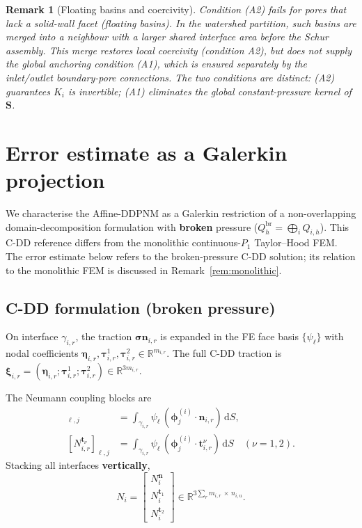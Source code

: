 \documentclass[11pt,a4paper]{article}
\newtheorem{remark}[lemma]{Remark}
\newcommand{\R}{\mathbb{R}}
\newcommand{\stress}{\bm{\sigma}}
\newcommand{\normal}{\bm{n}}
\newcommand{\Schur}{\mathbf{S}}
\begin{document}
\begin{remark}[Floating basins and coercivity]\label{rem:floating}
  Condition (A2) fails for pores that lack a solid-wall facet
  (\emph{floating basins}).  In the watershed partition, such basins
  are merged into a neighbour with a larger shared interface area
  before the Schur assembly.  This merge restores local coercivity
  (condition A2), but does \emph{not} supply the global anchoring
  condition (A1), which is ensured separately by the inlet/outlet
  boundary-pore connections.  The two conditions are distinct:
  (A2) guarantees $K_i$ is invertible; (A1) eliminates the global
  constant-pressure kernel of $\Schur$.
\end{remark}

\appendix
\section{Error estimate as a Galerkin projection}
\setcounter{lemma}{0}
\setcounter{theorem}{0}

We characterise the Affine-DDPNM as a Galerkin restriction of a
non-overlapping domain-decomposition formulation with \textbf{broken}
pressure ($Q_h^{\text{br}} = \bigoplus_i Q_{i,h}$).
This C-DD reference differs from the monolithic continuous-$P_1$
Taylor--Hood FEM.  The error estimate below refers to the broken-pressure
C-DD solution; its relation to the monolithic FEM is discussed in
Remark~\ref{rem:monolithic}.

\subsection{C-DD formulation (broken pressure)}

On interface $\gamma_{i,r}$, the traction $\stress\normal_{i,r}$ is
expanded in the FE face basis $\{\psi_\ell\}$ with nodal coefficients
$\bm{\eta}_{i,r},\bm{\tau}_{i,r}^1,\bm{\tau}_{i,r}^2 \in \R^{m_{i,r}}$.
The full C-DD traction is
$\bm{\xi}_{i,r} = (\bm{\eta}_{i,r}; \bm{\tau}_{i,r}^1; \bm{\tau}_{i,r}^2)
 \in \R^{3m_{i,r}}$.

The Neumann coupling blocks are
\begin{align*}
  [N_{i,r}^{\normal}]_{\ell,j} &=
    \int_{\gamma_{i,r}} \psi_\ell\,(\bm{\phi}_j^{(i)}
    \cdot \normal_{i,r})\,\mathrm{d}S,\\
  [N_{i,r}^{\bm{t}_\nu}]_{\ell,j} &=
    \int_{\gamma_{i,r}} \psi_\ell\,(\bm{\phi}_j^{(i)}
    \cdot \bm{t}_{i,r}^\nu)\,\mathrm{d}S \quad (\nu=1,2).
\end{align*}
Stacking all interfaces \textbf{vertically},
\[
  N_i =
  \begin{bmatrix}
    N_i^{\normal} \\ N_i^{\bm{t}_1} \\ N_i^{\bm{t}_2}
  \end{bmatrix}
  \in \R^{3\sum_r m_{i,r}\,\times\, n_{i,u}}.
\]
\end{document}
